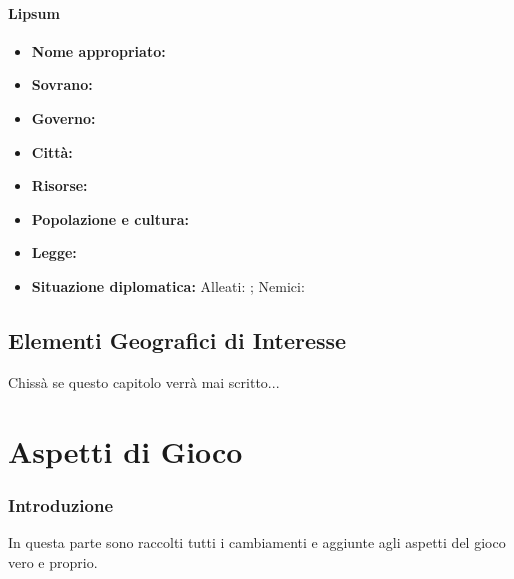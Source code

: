 \documentclass[a4paper]{report}
\begin{document}
\begin{multicols}{2}
\subsection*{Lipsum}
\begin{itemize}
	\item \textbf{Nome appropriato:}
	\item \textbf{Sovrano:} 
	\item \textbf{Governo:} 
	\item \textbf{Città:} 
	\item \textbf{Risorse:} 
	\item \textbf{Popolazione e cultura:} 
	\item \textbf{Legge:}
	\item \textbf{Situazione diplomatica:} Alleati: ; Nemici: 
\end{itemize}
\lipsum[1]

\end{multicols}



\chapter{Elementi Geografici di Interesse}
Chissà se questo capitolo verrà mai scritto...

\part{Aspetti di Gioco}
\section{Introduzione}
In questa parte sono raccolti tutti i cambiamenti e aggiunte agli aspetti del gioco vero e proprio.
\end{document}
